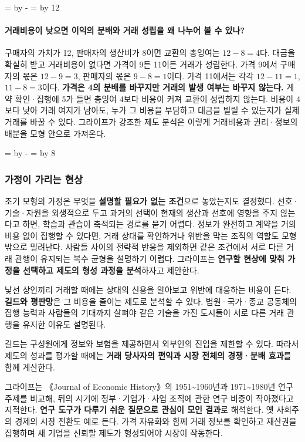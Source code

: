 \documentclass[10pt,a4paper]{article}
\newcommand{\ReserveQuestionSpace}{%
  \par\begingroup
  \dimen0=\pagegoal \advance\dimen0 by -\pagetotal
  \dimen2=\baselineskip \multiply\dimen2 by 12
  \ifdim\dimen0<\dimen2 \newpage\fi
  \endgroup}
\newcommand{\ReserveReadingSectionSpace}{%
  \par\begingroup
  \dimen0=\pagegoal \advance\dimen0 by -\pagetotal
  \dimen2=\baselineskip \multiply\dimen2 by 8
  \ifdim\dimen0<\dimen2 \newpage\fi
  \endgroup}
\begin{document}
\ReserveQuestionSpace
\paragraph{거래비용이 낮으면 이익의 분배와 거래 성립을 왜 나누어 볼 수 있나?}
구매자의 가치가 12, 판매자의 생산비가 8이면 교환의 총잉여는 $12-8=4$다. 대금을 확실히 받고 거래비용이 없다면 가격이 9든 11이든 거래가 성립한다. 가격 9에서 구매자의 몫은 $12-9=3$, 판매자의 몫은 $9-8=1$이다. 가격 11에서는 각각 $12-11=1$, $11-8=3$이다. \textbf{가격은 4의 분배를 바꾸지만 거래의 발생 여부는 바꾸지 않는다.} 계약 확인·집행에 5가 들면 총잉여 4보다 비용이 커져 교환이 성립하지 않는다. 비용이 4보다 낮아 거래 여지가 남아도, 누가 그 비용을 부담하고 대금을 빌릴 수 있는지가 실제 거래를 바꿀 수 있다. 그라이프가 강조한 제도 분석은 이렇게 거래비용과 권리·정보의 배분을 모형 안으로 가져온다.\par

\ReserveReadingSectionSpace
\subsubsection*{가정이 가리는 현상}

초기 모형의 가정은 무엇을 \textbf{설명할 필요가 없는 조건}으로 놓았는지도 결정했다. 선호·기술·자원을 외생적으로 두고 과거의 선택이 현재의 생산과 선호에 영향을 주지 않는다고 하면, 학습과 관습이 축적되는 경로를 묻기 어렵다. 정보가 완전하고 계약을 거의 비용 없이 집행할 수 있다면, 거래 상대를 확인하거나 위반을 막는 조직의 역할도 모형 밖으로 밀려난다. 사람들 사이의 전략적 반응을 제외하면 같은 조건에서 서로 다른 거래 관행이 유지되는 복수 균형을 설명하기 어렵다. 그라이프는 \textbf{연구할 현상에 맞춰 가정을 선택하고 제도의 형성 과정을 분석}하자고 제안한다.\par

낯선 상인끼리 거래할 때에는 상대의 신용을 알아보고 위반에 대응하는 비용이 든다. \textbf{길드와 평판망}은 그 비용을 줄이는 제도로 분석할 수 있다. 법원·국가·종교 공동체의 집행 능력과 사람들의 기대까지 살펴야 같은 기술을 가진 도시들이 서로 다른 거래 관행을 유지한 이유도 설명된다.\par

길드는 구성원에게 정보와 보험을 제공하면서 외부인의 진입을 제한할 수 있다. 따라서 제도의 성과를 평가할 때에는 \textbf{거래 당사자의 편익과 시장 전체의 경쟁·분배 효과}를 함께 계산한다.\par

그라이프는 《Journal of Economic History》의 1951\textasciitilde{}1960년과 1971\textasciitilde{}1980년 연구 주제를 비교해, 뒤의 시기에 정부·기업가·사업 조직에 관한 연구 비중이 작아졌다고 지적한다. \textbf{연구 도구가 다루기 쉬운 질문으로 관심이 모인 결과}로 해석한다. 옛 사회주의 경제의 시장 전환도 예로 든다. 가격 자유화와 함께 거래 정보를 확인하고 재산권을 집행하며 새 기업을 신뢰할 제도가 형성되어야 시장이 작동한다.\par
\end{document}
